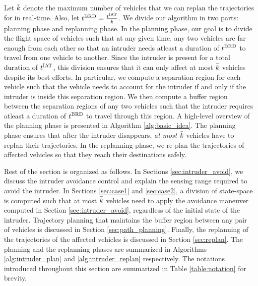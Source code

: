 Let $\bar{k}$ denote the maximum number of vehicles that we can replan the trajectories for in real-time. Also, let $t^\text{BRD} = \frac{t^\text{IAT}}{\bar{k}}$. We divide our algorithm in two parts: planning phase and replanning phase. In the planning phase, our goal is to divide the flight space of vehicles such that at any given time, any two vehicles are far enough from each other so that an intruder needs atleast a duration of $t^\text{BRD}$ to travel from one vehicle to another. Since the intruder is present for a total duration of $t^\text{IAT}$, this division ensures that it can only affect at most $\bar{k}$ vehicles despite its best efforts. In particular, we compute a separation region for each vehicle such that the vehicle needs to account for the intruder if and only if the intruder is inside this separation region. We then compute a buffer region between the separation regions of any two vehicles such that the intruder requires atleast a duration of $t^\text{BRD}$ to travel through this region. A high-level overview of the planning phase is presented in Algorithm \ref{alg:basic_idea}. The planning phase ensures that after the intruder disappears, \textit{at most $\bar{k}$} vehicles have to replan their trajectories. In the replanning phase, we re-plan the trajectories of affected vehicles so that they reach their destinations safely. %

Rest of the section is organized as follows. In Sections \ref{sec:intruder_avoid}, we discuss the intruder avoidance control and explain the sensing range required to avoid the intruder. In Sections \ref{sec:case1} and \ref{sec:case2}, a division of state-space is computed such that at most $\bar{k}$ vehicles need to apply the avoidance maneuver computed in Section \ref{sec:intruder_avoid}, regardless of the initial state of the intruder. %
Trajectory planning that maintains the buffer region between any pair of vehicles is discussed in Section \ref{sec:path_planning}. Finally, the replanning of the trajectories of the affected vehicles is discussed in Section \ref{sec:replan}. The planning and the replanning phases are summarized in Algorithms \ref{alg:intruder_plan} and \ref{alg:intruder_replan} respectively. The notations introduced throughout this section are summarized in Table \ref{table:notation} for brevity.

